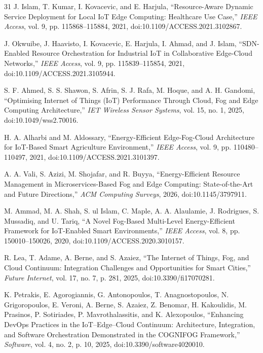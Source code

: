 \documentclass[conference]{IEEEtran}
\begin{document}
\begin{thebibliography}{31}
 J. Islam, T. Kumar, I. Kovacevic, and E. Harjula, ``Resource-Aware Dynamic Service Deployment for Local IoT Edge Computing: Healthcare Use Case,'' \emph{IEEE Access}, vol. 9, pp. 115868--115884, 2021, doi:10.1109/ACCESS.2021.3102867.

 J. Okwuibe, J. Haavisto, I. Kovacevic, E. Harjula, I. Ahmad, and J. Islam, ``SDN-Enabled Resource Orchestration for Industrial IoT in Collaborative Edge-Cloud Networks,'' \emph{IEEE Access}, vol. 9, pp. 115839--115854, 2021, doi:10.1109/ACCESS.2021.3105944.

 S. F. Ahmed, S. S. Shawon, S. Afrin, S. J. Rafa, M. Hoque, and A. H. Gandomi, ``Optimising Internet of Things (IoT) Performance Through Cloud, Fog and Edge Computing Architecture,'' \emph{IET Wireless Sensor Systems}, vol. 15, no. 1, 2025, doi:10.1049/wss2.70016.

 H. A. Alharbi and M. Aldossary, ``Energy-Efficient Edge-Fog-Cloud Architecture for IoT-Based Smart Agriculture Environment,'' \emph{IEEE Access}, vol. 9, pp. 110480--110497, 2021, doi:10.1109/ACCESS.2021.3101397.

 A. A. Vali, S. Azizi, M. Shojafar, and R. Buyya, ``Energy-Efficient Resource Management in Microservices-Based Fog and Edge Computing: State-of-the-Art and Future Directions,'' \emph{ACM Computing Surveys}, 2026, doi:10.1145/3797911.

 M. Ammad, M. A. Shah, S. ul Islam, C. Maple, A. A. Alaulamie, J. Rodrigues, S. Mussadiq, and U. Tariq, ``A Novel Fog-Based Multi-Level Energy-Efficient Framework for IoT-Enabled Smart Environments,'' \emph{IEEE Access}, vol. 8, pp. 150010--150026, 2020, doi:10.1109/ACCESS.2020.3010157.

 R. Lea, T. Adame, A. Berne, and S. Azaiez, ``The Internet of Things, Fog, and Cloud Continuum: Integration Challenges and Opportunities for Smart Cities,'' \emph{Future Internet}, vol. 17, no. 7, p. 281, 2025, doi:10.3390/fi17070281.

 K. Petrakis, E. Agorogiannis, G. Antonopoulos, T. Anagnostopoulos, N. Grigoropoulos, E. Veroni, A. Berne, S. Azaiez, Z. Benomar, H. Kakoulidis, M. Prasinos, P. Sotiriades, P. Mavrothalassitis, and K. Alexopoulos, ``Enhancing DevOps Practices in the IoT--Edge--Cloud Continuum: Architecture, Integration, and Software Orchestration Demonstrated in the COGNIFOG Framework,'' \emph{Software}, vol. 4, no. 2, p. 10, 2025, doi:10.3390/software4020010.


\end{thebibliography}
\end{document}
